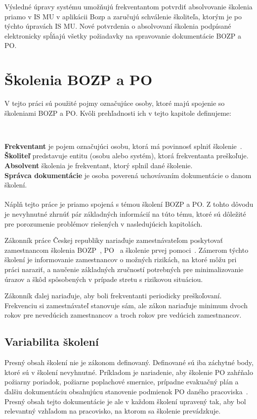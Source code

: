 \documentclass[
  digital,     %
  oneside,     %
  nosansbold,  %
  nocolorbold, %
  lof,         %
  nolot,         %
]{fithesis4}
\begin{document}
Výsledné úpravy systému umožňujú frekventantom potvrdiť absolvovanie školenia priamo v IS MU v aplikácii Bozp a zaručujú schválenie školiteľa, ktorým je po týchto úpravách IS MU. Nové potvrdenia o absolvovaní školenia podpísané elektronicky spĺňajú všetky požiadavky na spravovanie dokumentácie BOZP a PO.


\chapter{Školenia BOZP a PO}
\label{kap-1}
V tejto práci sú použité pojmy označujúce osoby, ktoré majú spojenie so školeniami BOZP a PO. Kvôli prehľadnosti ich v tejto kapitole definujeme:

~

    \textbf{Frekventant} je pojem označujúci osobu, ktorá má povinnosť splniť školenie~\cite[9]{kandova2019}.\\
    
    \textbf{Školiteľ} predstavuje entitu (osobu alebo systém), ktorá frekventanta preškoľuje.\\
    
    \textbf{Absolvent} školenia je frekventant, ktorý splnil dané školenie.\\

    \textbf{Správca dokumentácie} je osoba poverená uchovávaním dokumentácie o danom školení.
~
\\\\
Náplň tejto práce je priamo spojená s témou školení BOZP a PO. Z tohto dôvodu je nevyhnutné zhrnúť pár základných informácií na túto tému, ktoré sú dôležité pre porozumenie problémov riešených v nasledujúcich kapitolách.

Zákonník práce Českej republiky nariaďuje zamestnávateľom poskytovať zamestnancom školenia BOZP~\cite[§~103~odst.~3]{cesko_zakonik_prace}, PO~\cite[§~349~odst.~1]{cesko_zakonik_prace} a školenie prvej pomoci~\cite[§~102~odst.~6]{cesko_zakonik_prace}. Zámerom týchto školení je informovanie zamestnancov o možných rizikách, na ktoré môžu pri práci naraziť, a naučenie základných zručností potrebných pre minimalizovanie úrazov a škôd spôsobených v prípade stretu s rizikovou situáciou.

Zákonník ďalej nariaďuje, aby boli frekventanti periodicky preškoľovaní. Frekvenciu si zamestnávateľ stanovuje sám, ale zákon nariaďuje minimum dvoch rokov pre nevedúcich zamestnancov a troch rokov pre vedúcich zamestnancov.~\cite[~§103~odst.~3]{cesko_zakonik_prace}

\section{Variabilita školení}
Presný obsah školení nie je zákonom definovaný. Definované sú iba záchytné body, ktoré sú v školení nevyhnutné. Príkladom je nariadenie, aby školenie PO zahŕňalo požiarny poriadok, požiarne poplachové smernice, prípadne evakuačný plán a ďalšiu dokumentáciu obsahujúcu stanovenie podmienok PO daného pracoviska~\cite[~§23~odst.~1~c)]{cesko_vyhlaska_poziarna_prevence}. Presný obsah tejto dokumentácie je ale v každom školení upravený tak, aby bol relevantný vzhľadom na pracovisko, na ktorom sa školenie prevádzkuje.
\end{document}
